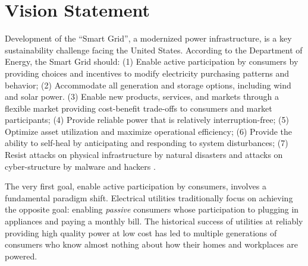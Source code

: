 
\section{Vision Statement}
\label{sec:vision}



Development of the ``Smart Grid'', a modernized power infrastructure, is a key sustainability challenge facing the United States. According to the Department of Energy, the Smart Grid should: (1) Enable active participation by consumers by providing choices and incentives to modify electricity purchasing patterns and behavior; (2) Accommodate all generation and storage options, including wind and solar power.  (3) Enable new products, services, and markets through a flexible market providing cost-benefit trade-offs to consumers and market participants; (4) Provide reliable power that is relatively interruption-free; (5) Optimize asset utilization and maximize operational efficiency; (6) Provide the ability to self-heal by anticipating and responding to system disturbances; (7) Resist attacks on physical infrastructure by natural disasters and attacks on cyber-structure by malware and hackers \cite{NETL:GridCharacteristics}.

The very first goal, enable active participation by consumers, involves a fundamental paradigm shift.
Electrical utilities traditionally focus on achieving the opposite goal: enabling {\em passive}
consumers whose participation to plugging in appliances and paying a monthly bill. The historical success of utilities at reliably providing high quality power at low cost has led to multiple generations of consumers who know almost nothing about how their homes and workplaces are powered.

